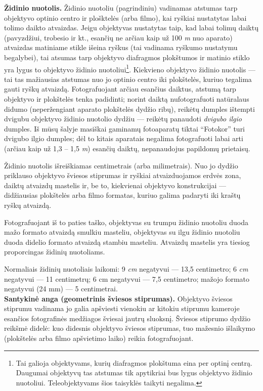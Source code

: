\documentclass{book}
\begin{document}
					\textbf{Židinio nuotolis.} Židinio nuotoliu (pagrindiniu) vadinamas atstumas tarp objektyvo optinio centro ir plošktelės (arba filmo), kai ryškiai nustatytas labai tolimo daikto atvaizdas. Jeigu objektyvas nustatytas taip, kad labai tolimų daiktų (pavyzdžiui, trobesio ir kt., esančių ne arčiau kaip už 100 \textit{m} nuo aparato) atvaizdas matiniame stikle išeina ryškus (tai vadinama ryškumo nustatymu begalybei), tai atsumas tarp objektyvo diafragmos plokštumos ir matinio stiklo yra lygus to objektyvo židinio nuotoliui\footnote{Tai galioja objektyvams, kurių diafragmos plokštuma eina per optinį centrą. Daugumai objektyvų tas atstumas tik apytikriai bus lygus objektyvo židinio nuotoliui. Teleobjektyvams šios taisyklės taikyti negalima.}. Kiekvieno objektyvo židinio nuotolis --- tai tas mažiausias atstumas nuo jo optinio centro iki plokštelės, kuriuo tegalima gauti ryškų atvaizdą. Fotografuojant arčiau esančius daiktus, atstumą tarp objektyvo ir plokštelės tenka padidinti; norint daiktą nufotografuoti natūralaus didumo (neperžengiant aparato plokštelės dydžio ribų), reikėtų dumples ištempti dvigubu objektyvo židinio nuotolio dydžiu --- reikėtų panaudoti \textit{dvigubo ilgio} dumples. Iš mūsų šalyje masiškai gaminamų fotoaparatų tiktai ``Fotokor'' turi dvigubo ilgio dumples; dėl to kitais aparatais negalima fotografuoti labai arti (arčiau kaip už 1,3 -- 1,5 \textit{m}) esančių daiktų, nepanaudojus papildomų prietaisų.

					Židinio nuotolis išreiškiamas centimetrais (arba milimetrais). Nuo jo dydžio priklauso objektyvo šviesos stiprumas ir ryškiai atvaizduojamos erdvės zona, daiktų atvaizdų mastelis ir, be to, kiekvienai objektyvo konstrukcijai --- didžiausias plokštelės arba filmo formatas, kuriuo galima padaryti iki kraštų ryškų atvaizdą.

					Fotografuojant iš to paties taško, objektyvas su trumpu židinio nuotoliu duoda mažo formato atvaizdą smulkiu masteliu, objektyvas su ilgu židinio nuotoliu duoda didelio formato atvaizdą stambiu masteliu. Atvaizdų mastelis yra tiesiog proporcingas židinių nuotoliams.

					Normaliais židinių nuotoliais laikomi: 9  \textit{cm} negatyvui --- 13,5 centimetro; 6  \textit{cm} negatyvui --- 11 centimetrų; 6  cm negatyvui --- 7,5 centimetro; mažojo formato negatyvui (24  mm) --- 5 centimetrai.\\

					\textbf{Santykinė anga (geometrinis šviesos stiprumas).} Objektyvo šviesos stiprumu vadinama jo galia apšviesti vienokiu ar kitokiu stiprumu kameroje esančios fotografinės medžiagos šviesai jautrų sluoksnį. Šviesos stiprumo dydžio reikšmė didelė: kuo didesnis objektyvo šviesos stiprumas, tuo mažesnio išlaikymo (plokštelės arba filmo apšvietimo laiko) reikia fotografuojant.
\end{document}
